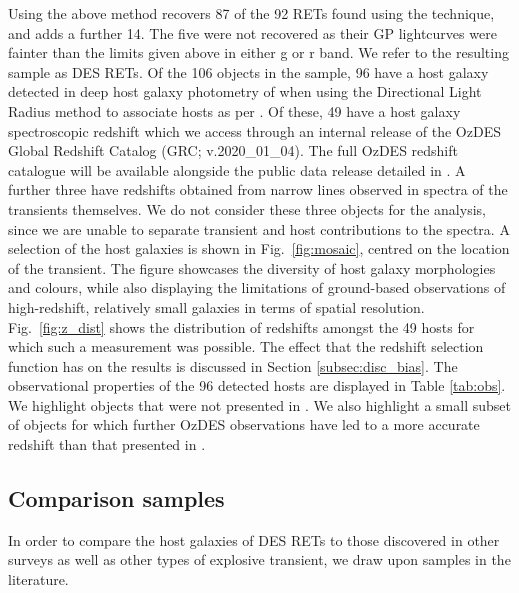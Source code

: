 \documentclass[fleqn,usenatbib,]{mnras}
\newcommand{\replyref}[1]{\color{magenta}#1 \color{black}}
\begin{document}
Using the above method recovers 87 of the 92 RETs found using the  technique, and adds a further 14. The five were not recovered as their GP lightcurves were fainter than the limits given above in either g or r band.
We refer to the resulting sample as DES RETs. Of the 106 objects in the sample, 96 have a host galaxy detected in deep host galaxy photometry of  when using the Directional Light Radius method \citep{Sullivan2006} to associate hosts as per . Of these, 49 have a host galaxy spectroscopic redshift which we access through an internal release of the OzDES Global Redshift Catalog (GRC; v.2020\_01\_04). The full OzDES redshift catalogue will be available alongside the public data release detailed in \citet{Lidman2020}. A further three have redshifts obtained from narrow lines observed in spectra of the transients themselves. We do not consider these three objects for the analysis, since we are unable to separate transient and host contributions to the spectra.
A selection of the host galaxies is shown in Fig.~\ref{fig:mosaic}, centred on the location of the transient. The figure showcases the diversity of host galaxy morphologies and colours, while also displaying the limitations of ground-based observations of high-redshift, relatively small galaxies in terms of spatial resolution.
Fig.~\ref{fig:z_dist} shows the distribution of redshifts amongst the 49 hosts for which such a measurement was possible. The effect that the redshift selection function has on the results is discussed in Section \ref{subsec:disc_bias}.
The observational properties of the 96 detected hosts are displayed in Table \ref{tab:obs}. We highlight objects that were not presented in . We also highlight a small subset of objects for which \replyref{further OzDES observations have led to a more accurate redshift than that presented in  \citetalias{Pursiainen2018}.} 

\subsection{Comparison samples \label{subsec:comparison}}

In order to compare the host galaxies of DES RETs to those discovered in other surveys as well as other types of explosive transient, we draw upon samples in the literature. 
\end{document}
